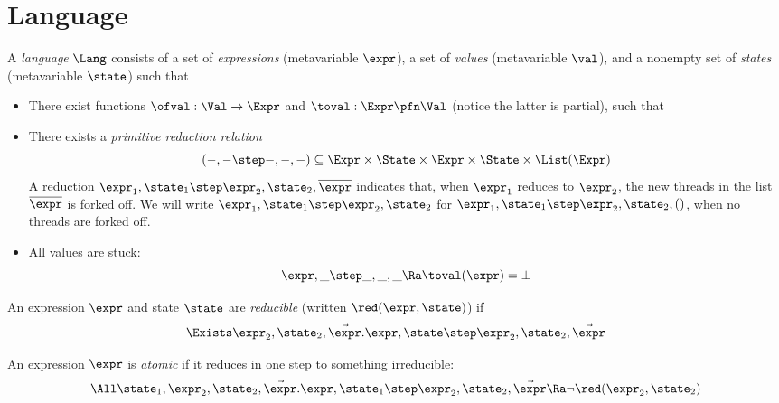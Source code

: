 \section{Language}
\label{sec:language}

A \emph{language} $\Lang$ consists of a set \Expr{} of \emph{expressions} (metavariable $\expr$), a set \Val{} of \emph{values} (metavariable $\val$), and a nonempty set \State of \emph{states} (metavariable $\state$) such that
\begin{itemize}[itemsep=0pt]
\item There exist functions $\ofval : \Val \to \Expr$ and $\toval : \Expr \pfn \Val$ (notice the latter is partial), such that
\item There exists a \emph{primitive reduction relation} \[(-,- \step -,-,-) \subseteq \Expr \times \State \times \Expr \times \State \times \List(\Expr)\]
  A reduction $\expr_1, \state_1 \step \expr_2, \state_2, \overline\expr$ indicates that, when $\expr_1$ reduces to $\expr_2$, the new threads in the list $\overline\expr$ is forked off.
  We will write $\expr_1, \state_1 \step \expr_2, \state_2$ for $\expr_1, \state_1 \step \expr_2, \state_2, ()$, \ie when no threads are forked off. \\
\item All values are stuck:
\[ \expr, \_ \step  \_, \_, \_ \Ra \toval(\expr) = \bot \]
\end{itemize}

\begin{defn}
  An expression $\expr$ and state $\state$ are \emph{reducible} (written $\red(\expr, \state)$) if
  \[ \Exists \expr_2, \state_2, \vec\expr. \expr,\state \step \expr_2,\state_2,\vec\expr \]
\end{defn}

\begin{defn}
  An expression $\expr$ is \emph{atomic} if it reduces in one step to something irreducible:
  \[ \All\state_1, \expr_2, \state_2, \vec\expr. \expr, \state_1 \step \expr_2, \state_2, \vec\expr \Ra \lnot \red(\expr_2, \state_2) \]
\end{defn}

